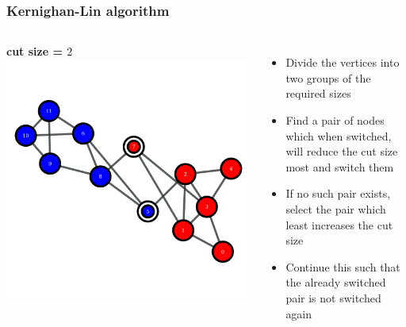 \documentclass{beamer}
\begin{document}
\begin{frame}
    \frametitle{Kernighan-Lin algorithm}
    \begin{columns}
        \centering
        {\bf cut size = $2$}
        \includegraphics[width=0.8\columnwidth]{kl2.pdf}

        \centering
        \begin{itemize}
            \setlength\itemsep{1em}
            \item{\small Divide the vertices into two groups of the required sizes}
            \item{\small Find a pair of nodes which when switched, will reduce the cut size most and switch them}
                \pause
            \item{\small If no such pair exists, select the pair which least increases the cut size}
                \pause
            \item{\small Continue this such that the already switched pair is not switched again}
        \end{itemize}
    \end{columns}
\end{frame}
\end{document}
